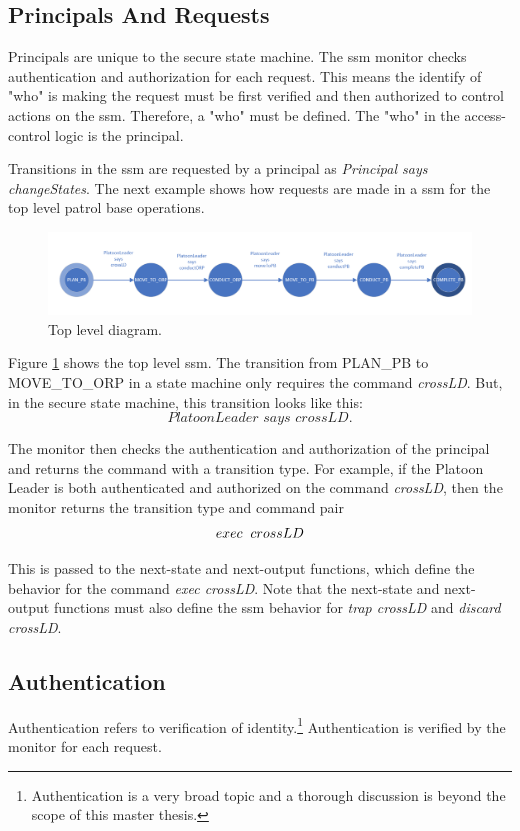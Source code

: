 \documentclass[../../main/main.tex]{subfiles}
\begin{document}
\subsection{Principals And Requests}
Principals are unique to the secure state machine.  The \gls{ssm} monitor checks authentication and authorization for each request.  This means the identify of "who" is making the request must be first verified and then authorized to control actions on the \gls{ssm}.  Therefore, a "who" must be defined.  The "who" in the access-control logic is the principal.  

Transitions in the \gls{ssm} are requested by a principal as \textit{Principal says changeStates}.  The next example shows how requests are made in a \gls{ssm} for the top level patrol base operations.

\begin{figure}[h!]
\centering
\includegraphics[width=\textwidth]{../figures/ssmPBDiagram}
\caption{\label{ssmPBDiagram2} Top level diagram.}
\end{figure}

Figure \ref{ssmPBDiagram2} shows the top level \gls{ssm}.  The transition from PLAN_PB to MOVE_TO_ORP in a state machine only requires the command \textit{crossLD}.  But, in the secure state machine, this transition looks like this:
 \[\textit{PlatoonLeader says crossLD}.\]

The monitor then checks the authentication and authorization of the principal and returns the command with a transition type.  For example, if the Platoon Leader is both authenticated and authorized on the command \textit{crossLD}, then the monitor returns the transition type and command pair 
\[exec \hspace{0.2cm} crossLD\]

This is passed to the next-state and next-output functions, which define the behavior for the command \textit{exec crossLD}.  Note that the next-state and next-output functions must also define the \gls{ssm} behavior for \textit{trap crossLD} and \textit{discard crossLD}.

\subsection{Authentication}
Authentication refers to verification of identity.\footnote{Authentication is a very broad topic and a thorough discussion is beyond the scope of this master thesis.}  Authentication is verified by the monitor for each request. 
\end{document}
